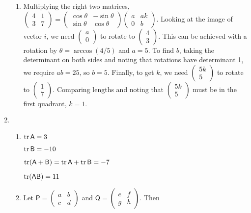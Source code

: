 \begin{enumerate}
\begin{enumerate}
\item Multiplying the right two matrices, $\begin{pmatrix} 4 & 1 \\ 3 & 7 \end{pmatrix} = \begin{pmatrix} \cos\theta & -\sin\theta \\ \sin\theta & \cos\theta \end{pmatrix}\begin{pmatrix} a & ak \\ 0 & b \end{pmatrix}$. Looking at the image of vector $\unit{i}$, we need $\begin{pmatrix} a \\ 0 \end{pmatrix}$ to rotate to $\begin{pmatrix} 4 \\ 3 \end{pmatrix}$. This can be achieved with a rotation by $\theta = \arccos(4/5)$ and $a = 5$. To find $b$, taking the determinant on both sides and noting that rotations have determinant 1, we require $ab = 25$, so $b = 5$. Finally, to get $k$, we need $\begin{pmatrix} 5k \\ 5 \end{pmatrix}$ to rotate to $\begin{pmatrix} 1 \\ 7 \end{pmatrix}$. Comparing lengths and noting that $\begin{pmatrix} 5k \\ 5 \end{pmatrix}$ must be in the first quadrant, $k = 1$.
\end{enumerate}
\item \begin{enumerate}
\item $\operatorname{tr}\mathsf{A} = 3$\par
$\operatorname{tr}\mathsf{B} = -10$\par
$\operatorname{tr}(\mathsf{A} + \mathsf{B}) = \operatorname{tr}\mathsf{A} + \operatorname{tr}\mathsf{B} = -7$\par
$\operatorname{tr}(\mathsf{AB}) = 11$
\item Let $\mathsf{P} = \begin{pmatrix} a & b \\ c & d \end{pmatrix}$ and $\mathsf{Q} = \begin{pmatrix} e & f \\ g & h \end{pmatrix}$. Then

\end{enumerate}
\end{enumerate}
